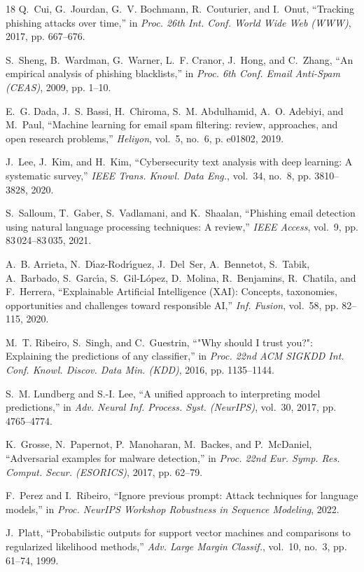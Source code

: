 \documentclass[conference]{IEEEtran}
\begin{document}
\begin{thebibliography}{18}
Q.~Cui, G.~Jourdan, G.~V. Bochmann, R.~Couturier, and I.~Onut, ``Tracking phishing attacks over time,'' in \emph{Proc. 26th Int. Conf. World Wide Web (WWW)}, 2017, pp. 667--676.

S.~Sheng, B.~Wardman, G.~Warner, L.~F. Cranor, J.~Hong, and C.~Zhang, ``An empirical analysis of phishing blacklists,'' in \emph{Proc. 6th Conf. Email Anti-Spam (CEAS)}, 2009, pp. 1--10.

E.~G. Dada, J.~S. Bassi, H.~Chiroma, S.~M. Abdulhamid, A.~O. Adebiyi, and M.~Paul, ``Machine learning for email spam filtering: review, approaches, and open research problems,'' \emph{Heliyon}, vol.~5, no.~6, p. e01802, 2019.

J.~Lee, J.~Kim, and H.~Kim, ``Cybersecurity text analysis with deep learning: A systematic survey,'' \emph{IEEE Trans. Knowl. Data Eng.}, vol.~34, no.~8, pp. 3810--3828, 2020.

S.~Salloum, T.~Gaber, S.~Vadlamani, and K.~Shaalan, ``Phishing email detection using natural language processing techniques: A review,'' \emph{IEEE Access}, vol.~9, pp. 83\,024--83\,035, 2021.

A.~B. Arrieta, N.~D{\'\i}az-Rodr{\'\i}guez, J.~Del~Ser, A.~Bennetot, S.~Tabik, A.~Barbado, S.~Garc{\'\i}a, S.~Gil-L{\'o}pez, D.~Molina, R.~Benjamins, R.~Chatila, and F.~Herrera, ``Explainable Artificial Intelligence (XAI): Concepts, taxonomies, opportunities and challenges toward responsible AI,'' \emph{Inf. Fusion}, vol.~58, pp. 82--115, 2020.

M.~T. Ribeiro, S.~Singh, and C.~Guestrin, ``"Why should I trust you?": Explaining the predictions of any classifier,'' in \emph{Proc. 22nd ACM SIGKDD Int. Conf. Knowl. Discov. Data Min. (KDD)}, 2016, pp. 1135--1144.

S.~M. Lundberg and S.-I. Lee, ``A unified approach to interpreting model predictions,'' in \emph{Adv. Neural Inf. Process. Syst. (NeurIPS)}, vol.~30, 2017, pp. 4765--4774.

K.~Grosse, N.~Papernot, P.~Manoharan, M.~Backes, and P.~McDaniel, ``Adversarial examples for malware detection,'' in \emph{Proc. 22nd Eur. Symp. Res. Comput. Secur. (ESORICS)}, 2017, pp. 62--79.

F.~Perez and I.~Ribeiro, ``Ignore previous prompt: Attack techniques for language models,'' in \emph{Proc. NeurIPS Workshop Robustness in Sequence Modeling}, 2022.

J.~Platt, ``Probabilistic outputs for support vector machines and comparisons to regularized likelihood methods,'' \emph{Adv. Large Margin Classif.}, vol.~10, no.~3, pp. 61--74, 1999.

\end{thebibliography}
\end{document}

